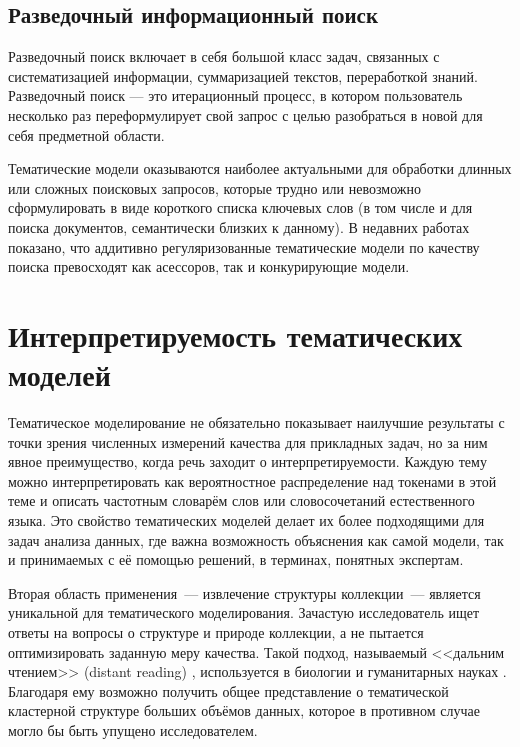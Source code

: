 \subsection{Разведочный информационный поиск}

Разведочный поиск включает в себя большой класс задач, связанных с систематизацией информации, суммаризацией текстов, переработкой знаний. Разведочный поиск --- это итерационный процесс, в котором пользователь несколько раз переформулирует свой запрос с целью разобраться в новой для себя предметной области. 

Тематические модели оказываются наиболее актуальными для обработки длинных или сложных поисковых запросов, которые трудно  или невозможно сформулировать в виде короткого списка ключевых слов (в том числе и для поиска документов, семантически близких к данному). В недавних работах \cite{ianina2017multi, ianina2019regularized} показано, что аддитивно регуляризованные тематические модели по качеству поиска превосходят как асессоров, так и конкурирующие модели.

\section{Интерпретируемость тематических моделей}

Тематическое моделирование не обязательно показывает наилучшие результаты с точки зрения численных измерений качества для прикладных задач, но за ним явное преимущество, когда речь заходит о интерпретируемости. Каждую тему можно интерпретировать как вероятностное распределение над токенами в этой теме и описать частотным словарём слов или словосочетаний естественного языка. Это свойство тематических моделей делает их более подходящими для задач анализа данных, где важна возможность объяснения как самой модели, так и принимаемых с её помощью решений, в терминах, понятных экспертам.

Вторая область применения~--- извлечение структуры коллекции~--- является уникальной для тематического моделирования. Зачастую исследователь ищет ответы на вопросы о структуре и природе коллекции, а не пытается оптимизировать заданную меру качества. Такой подход, называемый <<дальним чтением>> (distant reading) \cite{milkova2019distant}, используется в  биологии \cite{Liu2016,funnell2019integrated} и гуманитарных науках \cite{fntir2017applications,antons2019content}. Благодаря ему возможно получить общее представление о тематической кластерной структуре больших объёмов данных, которое в противном случае могло бы быть упущено исследователем.

